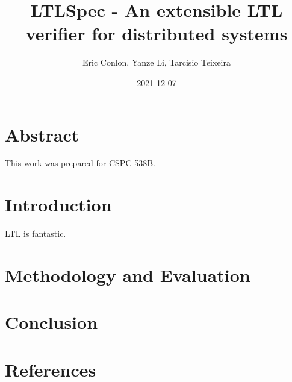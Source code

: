 \documentclass{article}
\title{LTLSpec - An extensible LTL verifier for distributed systems}
\author{Eric Conlon, Yanze Li, Tarcisio Teixeira}
\date{2021-12-07}
\begin{document}
\maketitle

\section{Abstract}

This work was prepared for CSPC 538B.

\section{Introduction}

LTL is fantastic. \cite{thiemann_actor_2016}

\section{Methodology and Evaluation}

\section{Conclusion}

\section{References}



\end{document}
